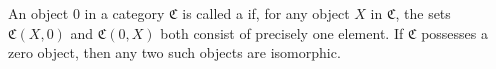 An object $0$ in a category $\mathfrak{C}$ is called a  if, for any object $X$ in $\mathfrak{C}$, the sets $\mathfrak{C}(X, 0)$ and $\mathfrak{C}(0, X)$ both consist of precisely one element. If $\mathfrak{C}$ possesses a zero object, then any two such objects are isomorphic.
